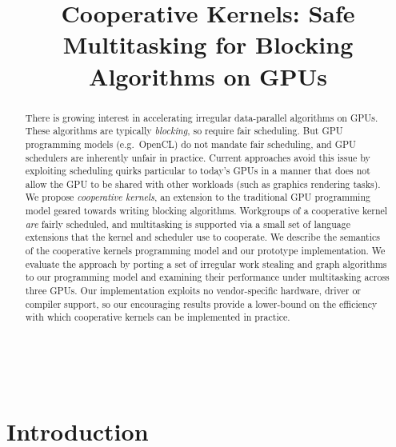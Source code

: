\documentclass[numbers,nocopyrightspace,10pt]{sigplanconf}
\begin{document}
\title{Cooperative Kernels: Safe Multitasking for Blocking Algorithms on GPUs}

%
%

\authorinfo{}
{\makebox{} \\
}
{}




\maketitle

\begin{abstract}
There is growing interest in accelerating irregular data-parallel
algorithms on GPUs.  These algorithms are typically \emph{blocking},
so require fair scheduling.  But GPU programming models (e.g.\ OpenCL)
do not mandate fair scheduling, and GPU schedulers are inherently
unfair in practice.  Current approaches avoid this issue by exploiting
scheduling quirks particular to today's GPUs in a manner that does not
allow the GPU to be shared with other workloads (such as graphics
rendering tasks).  We propose \emph{cooperative kernels}, an extension
to the traditional GPU programming model geared towards writing
blocking algorithms.  Workgroups of a cooperative kernel \emph{are}
fairly scheduled, and multitasking is supported via a small set of
language extensions that the kernel and scheduler use to cooperate.
We describe the semantics of the cooperative kernels programming model
and our prototype implementation.  We evaluate the approach by porting
a set of irregular work stealing and graph algorithms to our
programming model and examining their performance under multitasking
across three GPUs.  Our implementation exploits no
vendor-specific hardware, driver or compiler support, so our encouraging
results provide a lower-bound on the efficiency with
which cooperative kernels can be implemented in practice.

\end{abstract}
    
\section{Introduction}\label{sec:intro}
\end{document}
